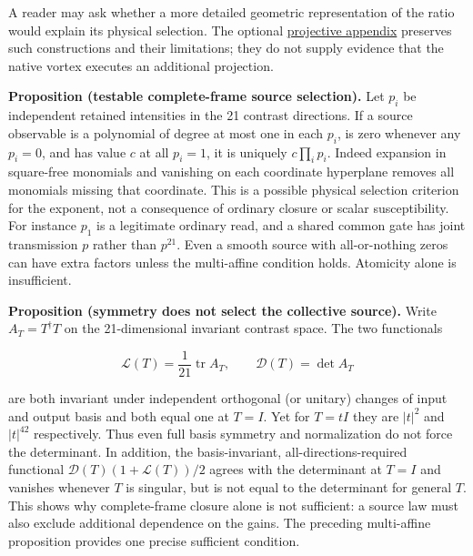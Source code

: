 \documentclass[
  11pt,
]{article}
\begin{document}
A reader may ask whether a more detailed geometric representation of the
ratio would explain its physical selection. The optional
\href{APPENDIX_PROJECTIVE_GEOMETRY.md}{projective appendix} preserves
such constructions and their limitations; they do not supply evidence
that the native vortex executes an additional projection.

\textbf{Proposition (testable complete-frame source selection).} Let
\(p_i\) be independent retained intensities in the 21 contrast
directions. If a source observable is a polynomial of degree at most one
in each \(p_i\), is zero whenever any \(p_i=0\), and has value \(c\) at
all \(p_i=1\), it is uniquely \(c\prod_i p_i\). Indeed expansion in
square-free monomials and vanishing on each coordinate hyperplane
removes all monomials missing that coordinate. This is a possible
physical selection criterion for the exponent, not a consequence of
ordinary closure or scalar susceptibility. For instance \(p_1\) is a
legitimate ordinary read, and a shared common gate has joint
transmission \(p\) rather than \(p^{21}\). Even a smooth source with
all-or-nothing zeros can have extra factors unless the multi-affine
condition holds. Atomicity alone is insufficient.

\textbf{Proposition (symmetry does not select the collective source).}
Write \(A_T=T^\dagger T\) on the 21-dimensional invariant contrast
space. The two functionals

\[\mathcal L(T)=\frac{1}{21}\operatorname{tr}A_T,\qquad \mathcal D(T)=\det A_T\]

are both invariant under independent orthogonal (or unitary) changes of
input and output basis and both equal one at \(T=I\). Yet for \(T=tI\)
they are \(|t|^2\) and \(|t|^{42}\) respectively. Thus even full basis
symmetry and normalization do not force the determinant. In addition,
the basis-invariant, all-directions-required functional
\(\mathcal D(T)(1+\mathcal L(T))/2\) agrees with the determinant at
\(T=I\) and vanishes whenever \(T\) is singular, but is not equal to the
determinant for general \(T\). This shows why complete-frame closure
alone is not sufficient: a source law must also exclude additional
dependence on the gains. The preceding multi-affine proposition provides
one precise sufficient condition.
\end{document}

